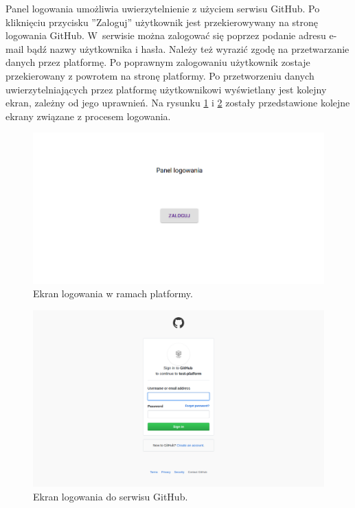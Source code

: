Panel logowania umożliwia uwierzytelnienie z użyciem serwisu GitHub.
Po kliknięciu przycisku ”Zaloguj” użytkownik jest przekierowywany na stronę logowania GitHub.
W~serwisie można zalogować się poprzez podanie adresu e-mail bądź nazwy użytkownika i hasła.
Należy też wyrazić zgodę na przetwarzanie danych przez platformę.
Po poprawnym zalogowaniu użytkownik zostaje przekierowany z powrotem na stronę platformy.
Po przetworzeniu danych uwierzytelniających przez platformę użytkownikowi wyświetlany jest kolejny ekran, zależny od jego uprawnień.
Na rysunku \ref{fig:log_in_button} i \ref{fig:log_in_github} zostały przedstawione kolejne ekrany związane z procesem logowania.

\begin{figure}[H]
    \centering
    \includegraphics[width = 13cm]{back/log_in_button.png}
    \caption{Ekran logowania w ramach platformy.}
    \label{fig:log_in_button}
\end{figure}

\begin{figure}[H]
    \centering
    \includegraphics[width = 13cm]{back/log_in_github.png}
    \caption{Ekran logowania do serwisu GitHub.}
    \label{fig:log_in_github}
\end{figure}


